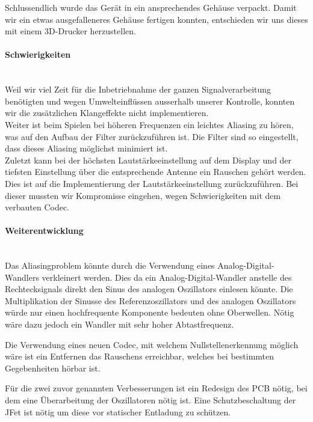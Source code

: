 Schlussendlich wurde das Gerät in ein ansprechendes Gehäuse verpackt. Damit wir ein etwas ausgefalleneres Gehäuse fertigen konnten, entschieden wir uns dieses mit einem 3D-Drucker herzustellen.

\paragraph{Schwierigkeiten}\mbox{}\\

Weil wir viel Zeit für die Inbetriebnahme der ganzen Signalverarbeitung benötigten und wegen Umwelteinflüssen ausserhalb unserer Kontrolle, konnten wir die zusätzlichen Klangeffekte nicht implementieren.\\
Weiter ist beim Spielen bei höheren Frequenzen ein leichtes Aliasing zu hören, was auf den Aufbau der Filter zurückzuführen ist. Die Filter sind so eingestellt, dass dieses Aliasing möglichst minimiert ist.\\
Zuletzt kann bei der höchsten Lautstärkeeinstellung auf dem Display und der tiefsten Einstellung über die entsprechende Antenne ein Rauschen gehört werden. Dies ist auf die Implementierung der Lautstärkeeinstellung zurückzuführen. Bei dieser mussten wir Kompromisse eingehen, wegen Schwierigkeiten mit dem verbauten Codec.

\paragraph{Weiterentwicklung}\mbox{}\\

Das Aliasingproblem könnte durch die Verwendung eines Analog-Digital-Wandlers verkleinert werden. Dies da ein Analog-Digital-Wandler anstelle des Rechtecksignals direkt den Sinus des analogen Oszillators einlesen könnte. Die Multiplikation der Sinusse des Referenzoszillators und des analogen Oszillators würde nur einen hochfrequente Komponente bedeuten ohne Oberwellen. Nötig wäre dazu jedoch ein Wandler mit sehr hoher Abtastfrequenz.

Die Verwendung eines neuen Codec, mit welchem Nullstellenerkennung möglich wäre ist ein Entfernen das Rauschens erreichbar, welches bei bestimmten Gegebenheiten hörbar ist.

Für die zwei zuvor genannten Verbesserungen ist ein Redesign des PCB nötig, bei dem eine Überarbeitung der Oszillatoren nötig ist. Eine Schutzbeschaltung der JFet ist nötig um diese vor statischer Entladung zu schützen.

